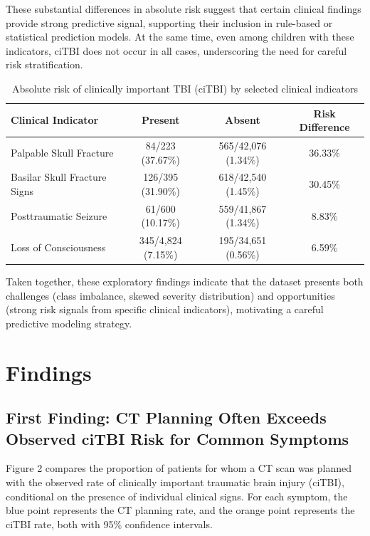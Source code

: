\documentclass[11pt,letterpaper]{article}
\begin{document}
These substantial differences in absolute risk suggest that certain clinical findings provide strong predictive signal, supporting their inclusion in rule-based or statistical prediction models. At the same time, even among children with these indicators, ciTBI does not occur in all cases, underscoring the need for careful risk stratification.

\begin{table}[ht]
\centering
\small
\caption{Absolute risk of clinically important TBI (ciTBI) by selected clinical indicators}
\begin{tabular}{lccc}
\toprule
\textbf{Clinical Indicator} 
& \textbf{Present} 
& \textbf{Absent} 
& \textbf{Risk Difference} \\
\midrule
Palpable Skull Fracture 
& 84/223 (37.67\%) 
& 565/42,076 (1.34\%) 
& 36.33\% \\

Basilar Skull Fracture Signs 
& 126/395 (31.90\%) 
& 618/42,540 (1.45\%) 
& 30.45\% \\

Posttraumatic Seizure 
& 61/600 (10.17\%) 
& 559/41,867 (1.34\%) 
& 8.83\% \\

Loss of Consciousness 
& 345/4,824 (7.15\%) 
& 195/34,651 (0.56\%) 
& 6.59\% \\
\bottomrule
\end{tabular}
\end{table}

Taken together, these exploratory findings indicate that the dataset presents both challenges (class imbalance, skewed severity distribution) and opportunities (strong risk signals from specific clinical indicators), motivating a careful predictive modeling strategy.

\section{Findings}\label{findings}

\subsection{First Finding: CT Planning Often Exceeds Observed ciTBI Risk for Common Symptoms}

Figure 2 compares the proportion of patients for whom a CT scan was planned with the observed rate of clinically important traumatic brain injury (ciTBI), conditional on the presence of individual clinical signs. For each symptom, the blue point represents the CT planning rate, and the orange point represents the ciTBI rate, both with 95\% confidence intervals.
\end{document}
